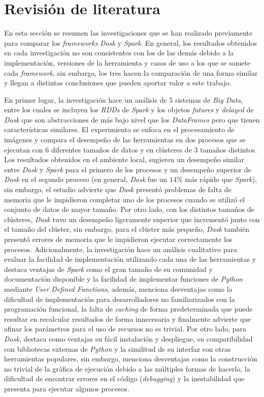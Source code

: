 \chapter{Revisión de literatura}

\noindent En esta sección se resumen las investigaciones que se han realizado previamente para comparar los \textit{frameworks} \textit{Dask} y \textit{Spark}. En general, los resultados obtenidos en cada investigación no son consistentes con los de las demás debido a la implementación, versiones de la herramienta y casos de uso a los que se somete cada \textit{framework}, sin embargo, los tres hacen la comparación de una forma similar y llegan a distintas conclusiones que pueden aportar valor a este trabajo.

En primer lugar, la investigación \cite{comparative-evolution} hace un análisis de 5 sistemas de \textit{Big Data}, entre los cuales se incluyen los \textit{RDDs} de \textit{Spark} y los objetos \textit{futures} y \textit{delayed} de \textit{Dask} que son abstracciones de más bajo nivel que los \textit{DataFrames} pero que tienen características similares. El experimiento se enfoca en el procesamiento de imágenes y compara el desempeño de las herramientas en dos procesos que se ejecutan con 6 diferentes tamaños de datos y en clústeres de 3 tamaños distintos. Los resultados obtenidos en el ambiente local, sugieren un desempeño similar entre \textit{Dask} y \textit{Spark} para el primero de los procesos y un desempeño superior de \textit{Dask} en el segundo proceso (en general, \textit{Dask} fue un $14\%$ más rápido que \textit{Spark}), sin embargo, el estudio advierte que \textit{Dask} presentó problemas de falta de memoria que le impidieron completar uno de los procesos cuando se utilizó el conjunto de datos de mayor tamaño. Por otro lado, con los distintos tamaños de clústeres, \textit{Dask} tuvo un desempeño ligeramente superior que incrementó junto con el tamaño del clúster, sin embargo, para el clúster más pequeño, \textit{Dask} también presentó errores de memoria que le impidieron ejecutar correctamente los procesos. Adicionalmente, la investigación hace un análisis cualitativo para evaluar la facilidad de implementación utilizando cada una de las herramientas y destaca ventajas de \textit{Spark} como el gran tamaño de su comunidad y documentación disponible y la facilidad de implementar funciones de \textit{Python} mediante \textit{User Defined Functions}, además, menciona desventajas como la dificultad de implementación para desarrolladores no familiarizados con la programación funcional, la falta de \textit{caching} de forma predeterminada que puede resultar en recalcular resultados de forma innecesaria y finalmente advierte que afinar los parámetros para el uso de recursos no es trivial. Por otro lado, para \textit{Dask}, destaca como ventajas su fácil instalación y despliegue, su compatibilidad con bibliotecas externas de \textit{Python} y la similitud de su interfaz con otras herramientas populares, sin embargo, menciona desventajas como la construcción no trivial de la gráfica de ejecución debido a las múltiples formas de hacerlo, la dificultad de encontrar errores en el código (\textit{debugging}) y la inestabilidad que presenta para ejecutar algunos procesos.


